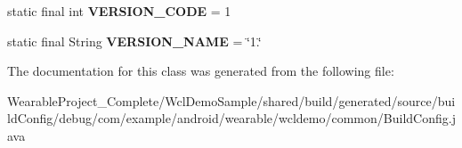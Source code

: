 \begin{DoxyCompactItemize}
\item 
static final int {\bfseries V\+E\+R\+S\+I\+O\+N\+\_\+\+C\+O\+DE} = 1\hypertarget{classcom_1_1example_1_1android_1_1wearable_1_1wcldemo_1_1common_1_1BuildConfig_a63cc517cb292076d531b98f3d931a4d8}{}\label{classcom_1_1example_1_1android_1_1wearable_1_1wcldemo_1_1common_1_1BuildConfig_a63cc517cb292076d531b98f3d931a4d8}

\item 
static final String {\bfseries V\+E\+R\+S\+I\+O\+N\+\_\+\+N\+A\+ME} = \char`\"{}1.\char`\"{}\hypertarget{classcom_1_1example_1_1android_1_1wearable_1_1wcldemo_1_1common_1_1BuildConfig_a415d9f44aebd1fba6485d2fd99c709bb}{}\label{classcom_1_1example_1_1android_1_1wearable_1_1wcldemo_1_1common_1_1BuildConfig_a415d9f44aebd1fba6485d2fd99c709bb}

\end{DoxyCompactItemize}


The documentation for this class was generated from the following file\+:\begin{DoxyCompactItemize}
\item 
Wearable\+Project\+\_\+\+Complete/\+Wcl\+Demo\+Sample/shared/build/generated/source/build\+Config/debug/com/example/android/wearable/wcldemo/common/Build\+Config.\+java\end{DoxyCompactItemize}
